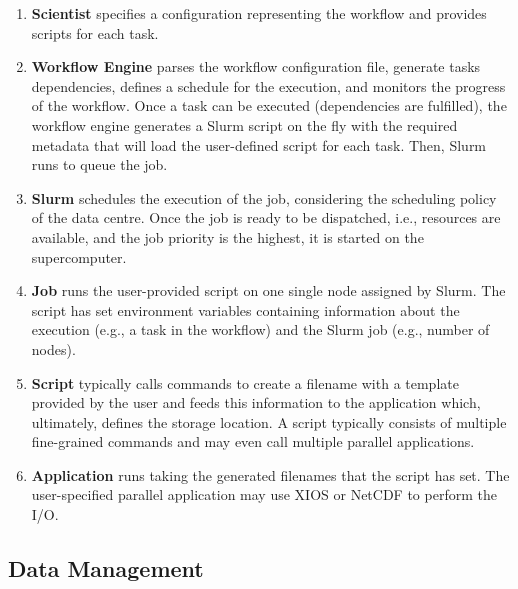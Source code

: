 \documentclass{superfri}
\begin{document}
\begin{enumerate}

  \item \textbf{Scientist} specifies a configuration representing the workflow and provides scripts for each task.

  \item \textbf{Workflow Engine} parses the workflow configuration file, generate tasks dependencies, defines a schedule for the execution, and monitors the progress of the workflow.
  Once a task can be executed (dependencies are fulfilled), the workflow engine generates a Slurm script on the fly with the required metadata that will load the user-defined script for each task. Then, Slurm runs to queue the job.

  \item \textbf{Slurm} \cite{Jette02slurm:simple} schedules the execution of the job, considering the scheduling policy of the data centre.
  Once the job is ready to be dispatched, i.e., resources are available, and the job priority is the highest, it is started on the supercomputer.

  \item \textbf{Job} runs the user-provided script on one single node assigned by Slurm.
  The script has set environment variables containing information about the execution (e.g., a task in the workflow) and the Slurm job (e.g., number of nodes).

  \item \textbf{Script} typically calls commands to create a filename with a template provided by the user and feeds this information to the application which, ultimately, defines the storage location.
  A script typically consists of multiple fine-grained commands and may even call multiple parallel applications.

  \item \textbf{Application} runs taking the generated filenames that the script has set.
  The user-specified parallel application may use XIOS \cite{xios} or NetCDF \cite{Jenter92netcdf:a} to perform the I/O.

\end{enumerate}

\subsection{Data Management}
\label{sec:datamanagement}
\end{document}
